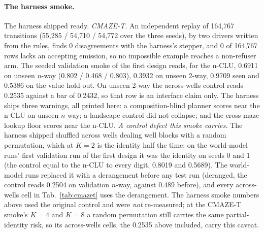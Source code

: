 \documentclass{article} %
\begin{document}
\paragraph{The harness smoke.} The harness shipped ready.
\emph{CMAZE-T.} An independent replay of 164,767 transitions (55,285 / 54,710 / 54,772 over the
three seeds), by two drivers written from the rules, finds 0 disagreements with the harness's
stepper, and 0 of 164,767 rows lacks an accepting emission, so no impossible example reaches a
non-refuser arm. The seeded validation smoke of the first design reads, for the n-CLU,
0.6911 on unseen $n$-way (0.802 / 0.468 / 0.803), 0.3932 on unseen 2-way, 0.9709 seen and 0.5386
on the value hold-out. On unseen 2-way the across-wells control reads 0.2535 against a bar of
0.2432, so that row is an interface claim only. The harness ships three warnings, all printed here: a composition-blind planner scores near the
n-CLU on unseen $n$-way; a landscape control did not collapse; and the cross-maze lookup floor
scores near the n-CLU.
\emph{A control defect this smoke carries.} The harness shipped
shuffled across wells dealing well blocks with a random permutation, which at
$K=2$ is the identity half the time; on the world-model runs' first validation run of the first design it was
the identity on seeds 0 and 1 (the control equal to the n-CLU to every digit, 0.8019 and 0.5689).
The world-model runs replaced it with a derangement before any test run (deranged, the control
reads 0.2504 on validation $n$-way, against 0.489 before), and every across-wells cell in
Tab.~\ref{tab:cmazet} uses the derangement. The harness smoke numbers above
used the original control and were \emph{not} re-measured; at the CMAZE-T smoke's $K=4$ and $K=8$ a
random permutation still carries the same partial-identity risk, so its across-wells cells,
the 0.2535 above included, carry this caveat.
\end{document}
